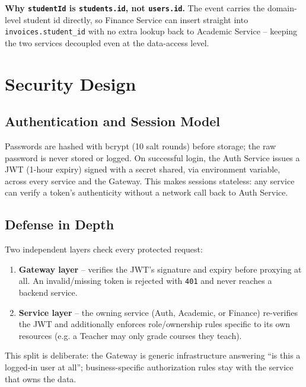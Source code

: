 \documentclass[11pt,a4paper]{report}
\begin{document}
\begin{infobox}
\textbf{Why \texttt{studentId} is \texttt{students.id}, not \texttt{users.id}.}
The event carries the domain-level student id directly, so Finance Service
can insert straight into \texttt{invoices.student\_id} with no extra lookup
back to Academic Service -- keeping the two services decoupled even at the
data-access level.
\end{infobox}

\chapter{Security Design}

\section{Authentication and Session Model}
Passwords are hashed with bcrypt (10 salt rounds) before storage; the raw
password is never stored or logged. On successful login, the Auth Service
issues a JWT (1-hour expiry) signed with a secret shared, via environment
variable, across every service and the Gateway. This makes sessions
stateless: any service can verify a token's authenticity without a network
call back to Auth Service.

\section{Defense in Depth}
Two independent layers check every protected request:
\begin{enumerate}[leftmargin=1.4em]
  \item \textbf{Gateway layer} -- verifies the JWT's signature and expiry before proxying at all. An invalid/missing token is rejected with \texttt{401} and never reaches a backend service.
  \item \textbf{Service layer} -- the owning service (Auth, Academic, or Finance) re-verifies the JWT and additionally enforces role/ownership rules specific to its own resources (e.g. a Teacher may only grade courses they teach).
\end{enumerate}
This split is deliberate: the Gateway is generic infrastructure answering
``is this a logged-in user at all''; business-specific authorization rules
stay with the service that owns the data.
\end{document}
